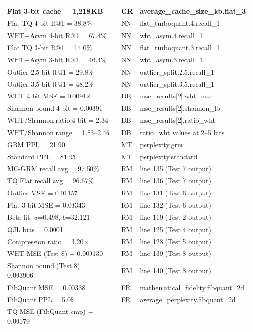 \begin{table}[H]
\begin{tabular}{@{}p{4.2cm}lp{4.5cm}@{}}
Flat 3-bit cache = 1{,}218\,KB
  & OR & average\_cache\_size\_kb.flat\_3 \\
\midrule
Flat TQ 4-bit R@1 = 38.8\%
  & NN & flat\_turboquant.4.recall\_1 \\
WHT+Asym 4-bit R@1 = 67.4\%
  & NN & wht\_asym.4.recall\_1 \\
Flat TQ 3-bit R@1 = 14.0\%
  & NN & flat\_turboquant.3.recall\_1 \\
WHT+Asym 3-bit R@1 = 46.4\%
  & NN & wht\_asym.3.recall\_1 \\
Outlier 2.5-bit R@1 = 29.8\%
  & NN & outlier\_split.2.5.recall\_1 \\
Outlier 3.5-bit R@1 = 48.2\%
  & NN & outlier\_split.3.5.recall\_1 \\
\midrule
WHT 4-bit MSE = 0.00912
  & DB & mse\_results[2].wht\_mse \\
Shannon bound 4-bit = 0.00391
  & DB & mse\_results[2].shannon\_lb \\
WHT/Shannon ratio 4-bit = 2.34
  & DB & mse\_results[2].ratio\_wht \\
WHT/Shannon range = 1.83--2.46
  & DB & ratio\_wht values at 2--5 bits \\
\midrule
GRM PPL = 21.90
  & MT & perplexity.grm \\
Standard PPL = 81.95
  & MT & perplexity.standard \\
MC-GRM recall avg = 97.50\%
  & RM & line 135 (Test 7 output) \\
TQ Flat recall avg = 96.67\%
  & RM & line 136 (Test 7 output) \\
\midrule
Outlier MSE = 0.01157
  & RM & line 131 (Test 6 output) \\
Flat 3-bit MSE = 0.03343
  & RM & line 132 (Test 6 output) \\
Beta fit: $a$=0.498, $b$=32.121
  & RM & line 119 (Test 2 output) \\
QJL bias = 0.0001
  & RM & line 125 (Test 4 output) \\
Compression ratio = 3.20$\times$
  & RM & line 128 (Test 5 output) \\
WHT MSE (Test 8) = 0.009130
  & RM & line 139 (Test 8 output) \\
Shannon bound (Test 8) = 0.003906
  & RM & line 140 (Test 8 output) \\
\midrule
FibQuant MSE = 0.00338
  & FR & mathematical\_fidelity.fibquant\_2d \\
FibQuant PPL = 5.05
  & FR & average\_perplexity.fibquant\_2d \\
TQ MSE (FibQuant cmp) = 0.00179

\end{tabular}
\end{table}
